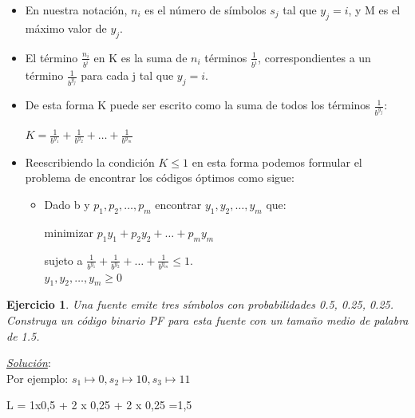 \documentclass{beamer}
\newtheorem{ejercicio} [Corolario]{Ejercicio}
\begin{document}
\begin{frame}  \small

\begin{itemize}
\item  En nuestra notación, $n_i$ es el número de símbolos $s_j$ tal que $y_j=i$, y M es el máximo valor de $y_j$. 

\item El término $\frac{n_i}{b^ i}$ en K es la suma de $n_i$ términos $\frac{1}{b^ i}$, correspondientes a un término $\frac{1}{b^{y_j}}$ para cada j tal que  $y_j = i$.


\item De esta forma K puede ser escrito como la suma de todos los términos $\frac{1}{b^{y_j}}$:

\begin{center}$K=\frac{1}{b^{y_1}}+\frac{1}{b^{y_2}}+ \ldots +\frac{1}{b^{y_m}}$ \end{center}


\item Reescribiendo la condición $K\leq 1$ en esta forma podemos formular el problema de encontrar los códigos óptimos como sigue:
\vspace{0.5cm}
\begin{itemize}
\item Dado b y $p_1,p_2, \ldots, p_m$ encontrar  $y_1,y_2,\ldots,y_m$ que:
\vspace{0.5cm}
\begin{center}minimizar  $p_1y_1 + p_2y_2 + \ldots + p_my_m$\end{center}
\begin{center}sujeto a $\frac{1}{b^{y_1}}+\frac{1}{b^{y_2}}+ \ldots +\frac{1}{b^{y_m}} \leq 1$.\\
$y_1,y_2,\ldots,y_m \geq 0$ 
\end{center}
\end{itemize}

\end{itemize}

\end{frame} 

\begin{frame}  \small

\begin{ejercicio}
Una fuente emite tres símbolos con probabilidades 0.5, 0.25, 0.25. Construya un código binario PF para esta fuente con un tamaño medio de palabra de 1.5.\\
\end{ejercicio}

\pause

\underline{\textit{{Solución}}}:\\

Por ejemplo: $s_1 \mapsto 0, s_2 \mapsto 10, s_3 \mapsto 11$
 \begin{center}
L = 1x0,5 + 2 x 0,25 + 2 x 0,25  =1,5
\end{center}

\end{frame} 
\end{document}
